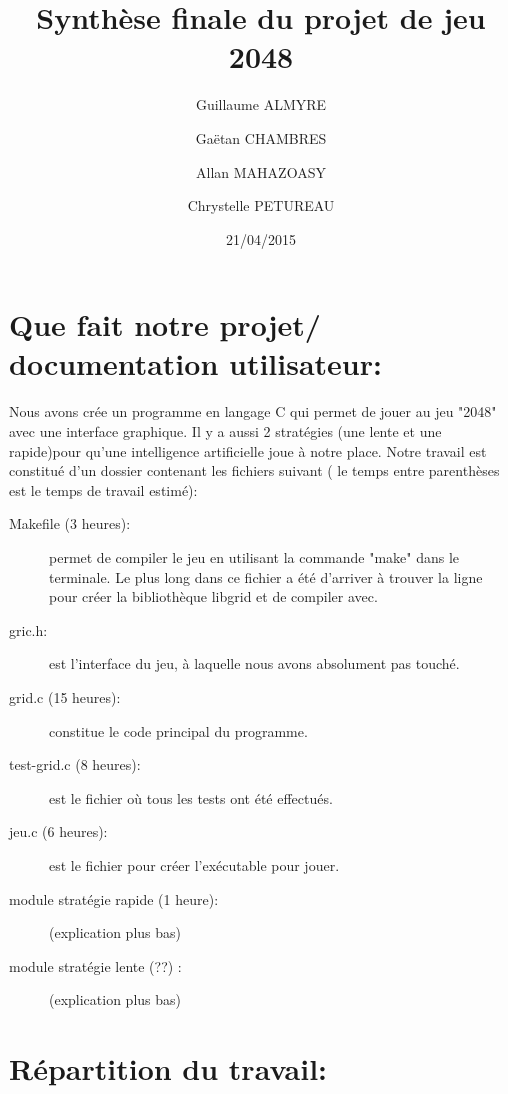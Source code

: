 \documentclass{report}
\begin{document}
\lstset{language=C}

\title{Synthèse finale du projet de jeu 2048}
\author{Guillaume ALMYRE 
\and
Ga\"{e}tan CHAMBRES
\and
Allan MAHAZOASY
\and 
Chrystelle PETUREAU}
\date{21/04/2015}

\maketitle

\section*{Que fait notre projet/ documentation utilisateur:}

Nous avons crée un programme en langage C qui permet de jouer au jeu "2048" avec une interface graphique. Il y a aussi 2 stratégies (une lente et une rapide)pour qu'une intelligence artificielle joue à notre place. Notre travail est constitué d'un dossier contenant les fichiers suivant ( le temps entre parenthèses est le temps de travail estimé):
\begin{description}
\item[Makefile (3 heures):] permet de compiler le jeu en utilisant la commande "make" dans le terminale. Le plus long dans ce fichier a été d'arriver à trouver la ligne pour créer la bibliothèque libgrid et de compiler avec.
\item [gric.h:] est l'interface du jeu, à laquelle nous avons absolument pas touché.
\item[grid.c (15 heures):] constitue le code principal du programme.
\item[test-grid.c (8 heures):] est le fichier où tous les tests ont été effectués.
\item[jeu.c (6 heures):] est le fichier pour créer l'exécutable pour jouer.
\item[module stratégie rapide (1 heure):] (explication plus bas)
\item[module stratégie lente (??) :](explication plus bas)
\end{description}

\section*{Répartition du travail:}
\end{document}

